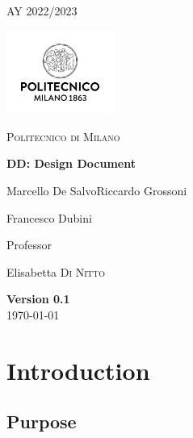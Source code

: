 \documentclass[table, 12pt]{article}
\begin{document}
\begin{titlepage}
    \centering
    {\scshape\large AY 2022/2023 \par}
    \vfill
    \includegraphics[width=100pt]{assets/logo_polimi.jpg}\par\vspace{1cm}
    {\scshape\LARGE Politecnico di Milano \par}
    \vspace{1.5cm}
    {\huge\bfseries DD\@: Design Document \par}
    \vspace{2cm}
    {\Large {Marcello De Salvo\quad Riccardo Grossoni \par Francesco Dubini}\par}
    \vfill
    {\large Professor\par
        Elisabetta \textsc{Di Nitto}}
    \vfill
    {\large \textbf{Version 0.1}\\ \today \par}
\end{titlepage}


\thispagestyle{plain}
\mbox{}
\newpage
{}
\tableofcontents
\newpage
{}

\section{Introduction}

\subsection{Purpose}
\end{document}
